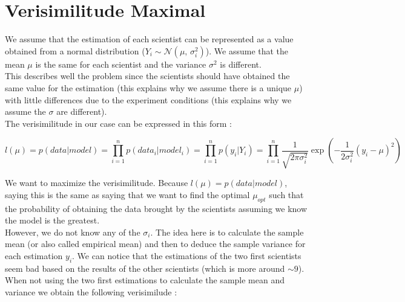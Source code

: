 \documentclass{article}
\begin{document}

\pagebreak


\section{Verisimilitude Maximal}

We assume that the estimation of each scientist can be represented as a value obtained from a normal distribution ($Y_i \sim \mathcal{N}(\mu,\,\sigma^{2}_i)$). We assume that the mean $\mu$ is the same for each scientist and the variance $\sigma^2$ is different. \\

This describes well the problem since the scientists should have obtained the same value for the estimation (this explains why we assume there is a unique $\mu$) with little differences due to the experiment conditions (this explains why we assume the $\sigma$ are different). \\

The verisimilitude in our case can be expressed in this form :

$$l(\mu) = p(data | model) = \displaystyle \prod^n_{i=1} p(data_i|model_i) = \displaystyle \prod^n_{i=1} p(y_i|Y_i) = \displaystyle \prod^n_{i=1} \dfrac{1}{\sqrt{2\pi\sigma_i^2}} \exp(-\dfrac{1}{2\sigma_i^2}(y_i-\mu)^2)$$

We want to maximize the verisimilitude. Because $l(\mu) = p(data | model)$, saying this is the same as saying that we want to find the optimal $\mu_{opt}$ such that the probability of obtaining the data brought by the scientists assuming we know the model is the greatest.\\

However, we do not know any of the $\sigma_i$. The idea here is to calculate the sample mean (or also called empirical mean) and then to deduce the sample variance for each estimation $y_i$. We can notice that the estimations of the two first scientists seem bad based on the results of the other scientists (which is more around $\sim 9$). When not using the two first estimations to calculate the sample mean and variance we obtain the following verisimilude :
\end{document}
